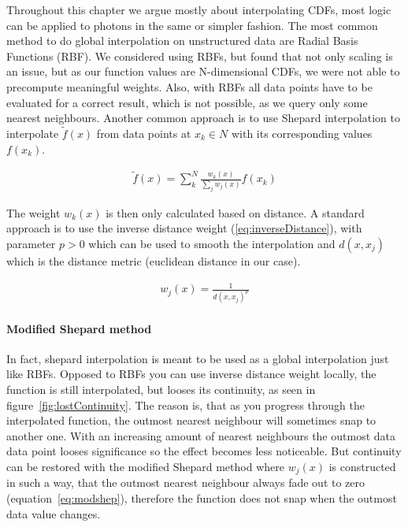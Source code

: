 Throughout this chapter we argue mostly about interpolating CDFs, most logic can be applied to photons in the same or simpler fashion. The most common method to do global interpolation on unstructured data are Radial Basis Functions (RBF). We considered using RBFs, but found that not only scaling is an issue, but as our function values are N-dimensional CDFs, we were not able to precompute meaningful weights. Also, with RBFs all data points have to be evaluated for a correct result, which is not possible, as we query only some nearest neighbours. Another common approach is to use Shepard interpolation to interpolate $\widetilde{f}(x)$ from data points at $x_k \in N$ with its corresponding values $f(x_k)$. 

\begin{align}\label{eq:shepard}
\widetilde{f}(x) = \sum_{k}^{N}\frac{w_k(x)}{\sum\nolimits_{j}w_j(x)}f(x_k)
\end{align}

The weight $w_k(x)$ is then only calculated based on distance. A standard approach is to use the inverse distance weight (\ref{eq:inverseDistance}), with parameter $p > 0$ which can be used to smooth the interpolation and $d(x, x_j)$ which is the distance metric (euclidean distance in our case).

\begin{align}\label{eq:inverseDistance}
w_j(x) = \frac{1}{d(x, x_j)^p}
\end{align}

\paragraph{Modified Shepard method}

In fact, shepard interpolation is meant to be used as a global interpolation just like RBFs. Opposed to RBFs you can use inverse distance weight locally, the function is still interpolated, but looses its continuity, as seen in figure~\ref{fig:lostContinuity}. The reason is, that as you progress through the interpolated function, the outmost nearest neighbour will sometimes snap to another one. With an increasing amount of nearest neighbours the outmost data data point looses significance so the effect becomes less noticeable. But continuity can be restored with the modified Shepard method  where $w_j(x)$ is constructed in such a way, that the outmost nearest neighbour always fade out to zero (equation~\ref{eq:modshep}), therefore the function does not snap when the outmost data value changes.

